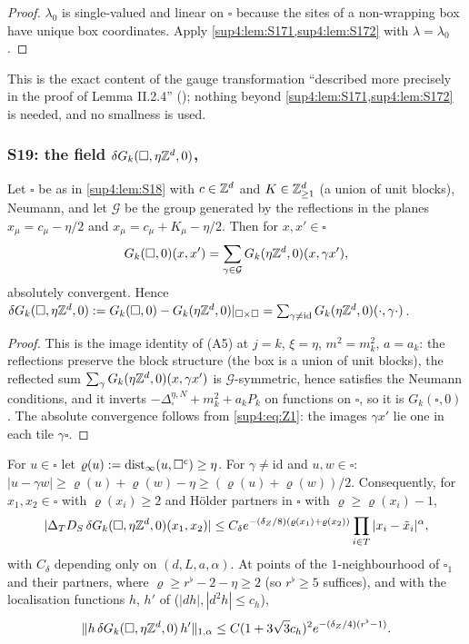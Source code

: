 \begin{proof}
$\lambda_0$ is single-valued and linear on $\square$ because the sites of a non-wrapping box have unique box coordinates. Apply \cref{sup4:lem:S171,sup4:lem:S172} with $\lambda=\lambda_0$.
\end{proof}

This is the exact content of the gauge transformation ``described more precisely in the proof of Lemma II.2.4'' (\cite[(2.69)--(2.74)]{Ba2}); nothing beyond \cref{sup4:lem:S171,sup4:lem:S172} is needed, and no smallness is used.

\subsubsection*{S19: the field $\delta G_k(\square,\eta\mathbb Z^d,0)$, \cite[p.~433]{Ba3}}

\begin{lemma}[images]\label{sup4:lem:S191}
Let $\square$ be as in \cref{sup4:lem:S18} with $c\in\mathbb Z^d$ and $K\in\mathbb Z^d_{\ge1}$ (a union of unit blocks), Neumann, and let $\mathcal G$ be the group generated by the reflections in the planes $x_\mu=c_\mu-\eta/2$ and $x_\mu=c_\mu+K_\mu-\eta/2$. Then for $x,x'\in\square$
\[
G_k(\square,0)(x,x')=\sum_{\gamma\in\mathcal G}G_k(\eta\mathbb Z^d,0)(x,\gamma x'),
\]
absolutely convergent. Hence $\delta G_k(\square,\eta\mathbb Z^d,0):= G_k(\square,0)-G_k(\eta\mathbb Z^d,0)|_{\square\times\square}=\sum_{\gamma\ne\mathrm{id}}G_k(\eta\mathbb Z^d,0)(\cdot,\gamma\cdot)$.
\end{lemma}

\begin{proof}
This is the image identity of (A5) at $j=k$, $\xi=\eta$, $m^2=m_k^2$, $a=a_k$: the reflections preserve the block structure (the box is a union of unit blocks), the reflected sum $\sum_\gamma G_k(\eta\mathbb Z^d,0)(x,\gamma x')$ is $\mathcal G$-symmetric, hence satisfies the Neumann conditions, and it inverts $-\Delta^{\eta,N}_\square+m_k^2+a_kP_k$ on functions on $\square$, so it is $G_k(\square,0)$. The absolute convergence follows from \eqref{sup4:eq:Z1}: the images $\gamma x'$ lie one in each tile $\gamma\square$.
\end{proof}

\begin{lemma}[bound]\label{sup4:lem:S192}
For $u\in\square$ let $\varrho(u):=\operatorname{dist}_\infty(u,\square^c)\ge\eta$. For $\gamma\ne\mathrm{id}$ and $u,w\in\square$: $|u-\gamma w|\ge\varrho(u)+\varrho(w)-\eta\ge(\varrho(u)+\varrho(w))/2$. Consequently, for $x_1,x_2\in\square$ with $\varrho(x_i)\ge2$ and H\"older partners in $\square$ with $\varrho\ge\varrho(x_i)-1$,
\[
|\Delta_TD_S\,\delta G_k(\square,\eta\mathbb Z^d,0)(x_1,x_2)|\le C_\delta e^{-(\delta_Z/8)(\varrho(x_1)+\varrho(x_2))}\prod_{i\in T}|x_i-\tilde x_i|^\alpha,
\]
with $C_\delta$ depending only on $(d,L,a,\alpha)$. At points of the $1$-neighbourhood of $\square_1$ and their partners, where $\varrho\ge r^\flat-2-\eta\ge2$ (so $r^\flat\ge5$ suffices), and with the localisation functions $h$, $h'$ of \cite[p.~432]{Ba3} ($|d h|,|d^2h|\le c_h$),
\[
\lVert h\,\delta G_k(\square,\eta\mathbb Z^d,0)\,h'\rVert_{1,\alpha}\le C(1+3\sqrt3c_h)^2e^{-(\delta_Z/4)(r^\flat-1)}.
\]
\end{lemma}

